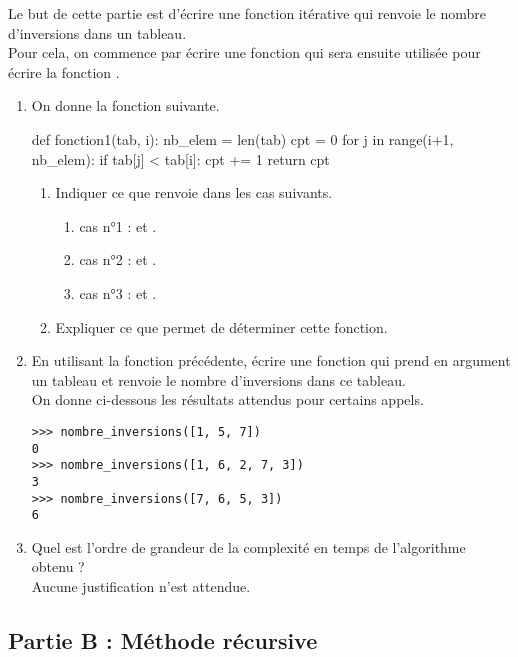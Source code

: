 \documentclass[a4paper,12pt,french]{book}
\begin{document}
Le but de cette partie est d’écrire une fonction itérative  qui renvoie le
nombre d’inversions dans un tableau.\\
Pour cela, on commence par écrire une fonction  qui sera ensuite utilisée pour écrire la fonction .
\begin{enumerate}[\bfseries 1.]
	\item 	On donne la fonction suivante.
    \begin{pythoncode}
def fonction1(tab, i):
    nb_elem = len(tab)
    cpt = 0
    for j in range(i+1, nb_elem):
        if tab[j] < tab[i]:
        cpt += 1
    return cpt
\end{pythoncode}
    \begin{enumerate}[\bfseries a.]
    	\item 	 Indiquer ce que renvoie  dans les cas suivants.
        \begin{enumerate}[\textbullet]
        	\item 	  cas n°1 :  et .
        	\item 	 cas n°2 :  et .
            \item    cas n°3 :  et .
        \end{enumerate}

    	\item Expliquer ce que permet de déterminer cette fonction.
    \end{enumerate}
	\item  En utilisant la fonction précédente, écrire une fonction  qui
    prend en argument un tableau et renvoie le nombre d’inversions dans ce tableau.\\
    On donne ci-dessous les résultats attendus pour certains appels.
\begin{verbatim}
>>> nombre_inversions([1, 5, 7])
0
>>> nombre_inversions([1, 6, 2, 7, 3])
3
>>> nombre_inversions([7, 6, 5, 3])
6
\end{verbatim}

\item  Quel est l’ordre de grandeur de la complexité en temps de l'algorithme obtenu ?\\
    Aucune justification n'est attendue.
\end{enumerate}
\subsection*{Partie B : Méthode récursive}
\end{document}
